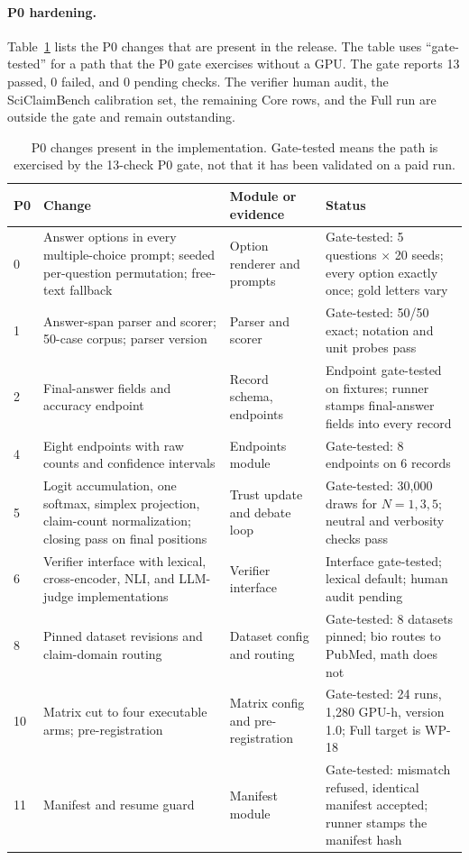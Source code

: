\paragraph*{P0 hardening.}
Table~\ref{tab:p0-changes} lists the P0 changes that are present in the release. The table uses ``gate-tested'' for a path that the P0 gate exercises without a GPU. The gate reports 13 passed, 0 failed, and 0 pending checks. The verifier human audit, the SciClaimBench calibration set, the remaining Core rows, and the Full run are outside the gate and remain outstanding.

\begin{table}[H]
  \centering
  \caption{P0 changes present in the implementation. Gate-tested means the path is exercised by the 13-check P0 gate, not that it has been validated on a paid run.}
  \renewcommand{\arraystretch}{1.25}
  \small
  \begin{tabular}{|p{}|p{}|p{}|p{}|}
    \hline
    P0 & Change & Module or evidence & Status \\
    \hline
    0 & Answer options in every multiple-choice prompt; seeded per-question permutation; free-text fallback & Option renderer and prompts & Gate-tested: 5 questions $\times$ 20 seeds; every option exactly once; gold letters vary \\
    \hline
    1 & Answer-span parser and scorer; 50-case corpus; parser version & Parser and scorer & Gate-tested: 50/50 exact; notation and unit probes pass \\
    \hline
    2 & Final-answer fields and accuracy endpoint & Record schema, endpoints & Endpoint gate-tested on fixtures; runner stamps final-answer fields into every record \\
    \hline
    4 & Eight endpoints with raw counts and confidence intervals & Endpoints module & Gate-tested: 8 endpoints on 6 records \\
    \hline
    5 & Logit accumulation, one softmax, simplex projection, claim-count normalization; closing pass on final positions & Trust update and debate loop & Gate-tested: 30,000 draws for $N=1,3,5$; neutral and verbosity checks pass \\
    \hline
    6 & Verifier interface with lexical, cross-encoder, NLI, and LLM-judge implementations & Verifier interface & Interface gate-tested; lexical default; human audit pending \\
    \hline
    8 & Pinned dataset revisions and claim-domain routing & Dataset config and routing & Gate-tested: 8 datasets pinned; bio routes to PubMed, math does not \\
    \hline
    10 & Matrix cut to four executable arms; pre-registration & Matrix config and pre-registration & Gate-tested: 24 runs, 1{,}280 GPU-h, version 1.0; Full target is WP-18 \\
    \hline
    11 & Manifest and resume guard & Manifest module & Gate-tested: mismatch refused, identical manifest accepted; runner stamps the manifest hash \\
    \hline
  \end{tabular}
  \label{tab:p0-changes}
\end{table}


